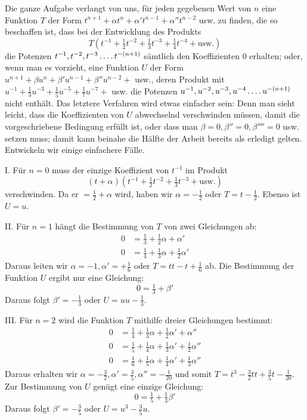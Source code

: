 Die ganze Aufgabe verlangt von uns, für jeden gegebenen Wert von $n$ eine Funktion $T$ der Form $t^{n+1}+\alpha t^n+\alpha't^{n-1}+\alpha''t^{n-2}$ usw. zu finden, die so beschaffen ist, dass bei der Entwicklung des Produkts
\[
T(t^{-1}+\tfrac12t^{-2}+\tfrac13t^{-3}+\tfrac14t^{-4}+\text{usw.})
\]
die Potenzen $t^{-1},t^{-2},t^{-3}\mathinner{.\,.\,.\,.}t^{-(n+1)}$ sämtlich den Koeffizienten $0$ erhalten; oder, wenn man es vorzieht, eine Funktion $U$ der Form $u^{n+1}+\beta u^n+\beta'u^{n-1}+\beta''u^{n-2}+$ usw., deren Produkt mit $u^{-1}+\frac13u^{-3}+\frac15u^{-5}+\frac17u^{-7}+$ usw. die Potenzen %
$u^{-1},u^{-2},u^{-3},u^{-4}\mathinner{.\,.\,.\,.}u^{-(n+1)}$ nicht enthält. Das letztere Verfahren wird etwas einfacher sein: Denn man sieht leicht, dass die Koeffizienten von $U$ abwechselnd verschwinden müssen, damit die vorgeschriebene Bedingung erfüllt ist, oder dass man $\beta=0,\beta''=0,\beta''''=0$ usw. setzen muss; damit kann beinahe die Hälfte der Arbeit bereits als erledigt gelten. Entwickeln wir einige einfachere Fälle.

I. Für $n=0$ muss der einzige Koeffizient von $t^{-1}$ im Produkt
\[
(t+\alpha)(t^{-1}+\tfrac12t^{-2}+\tfrac13t^{-3}+\text{usw.})
\]
verschwinden. Da er $=\frac12+\alpha$ wird, haben wir $\alpha=-\frac12$ oder $T=t-\frac12$. Ebenso ist $U=u$.

II. Für $n=1$ hängt die Bestimmung von $T$ von zwei Gleichungen ab:
\[
\begin{aligned}
0&=\tfrac13+\tfrac12\alpha+\alpha'\\
0&=\tfrac14+\tfrac13\alpha+\tfrac12\alpha'
\end{aligned}
\]
Daraus leiten wir $\alpha=-1,\alpha'=+\frac16$ oder $T=tt-t+\frac16$ ab. Die Bestimmung der Funktion $U$ ergibt nur eine Gleichung:
\[
0=\tfrac13+\beta'
\]
Daraus folgt $\beta'=-\frac13$ oder $U=uu-\frac13$.

III. Für $n=2$ wird die Funktion $T$ mithilfe dreier Gleichungen bestimmt:
\[
\begin{aligned}
0&=\tfrac14+\tfrac13\alpha+\tfrac12\alpha'+\alpha''\\
0&=\tfrac15+\tfrac14\alpha+\tfrac13\alpha'+\tfrac12\alpha''\\
0&=\tfrac16+\tfrac15\alpha+\tfrac14\alpha'+\tfrac13\alpha''
\end{aligned}
\]
Daraus erhalten wir $\alpha=-\frac32,\alpha'=\frac35,\alpha''=-\frac1{20}$ und somit $T=t^3-\frac32tt+\frac35t-\frac1{20}$. Zur Bestimmung von $U$ genügt eine einzige Gleichung:
\[
0=\tfrac15+\tfrac13\beta'
\]
Daraus folgt $\beta'=-\frac35$ oder $U=u^3-\frac35u$.

